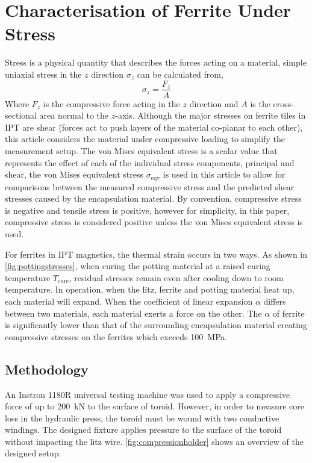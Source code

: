 \documentclass[conference]{IEEEtran}
\begin{document}
\section{Characterisation of Ferrite Under Stress}
Stress is a physical quantity that describes the forces acting on a material, simple uniaxial stress in the $z$ direction $\sigma_z$ can be calculated from, 
\begin{equation}
  \sigma_z = \frac{F_z}{A}
  \label{eqn:uniaxialstress}
\end{equation}
Where $F_z$ is the compressive force acting in the $z$ direction and $A$ is the cross-sectional area normal to the $z$-axis. 
Although the major stresses on ferrite tiles in IPT are shear (forces act to push layers of the material co-planar to each other), this article considers the material under compressive loading to simplify the measurement setup. 
The von Mises equivalent stress is a scalar value that represents the effect of each of the individual stress components, principal and shear, the von Mises equivalent stress $\sigma_\text{eqv}$ is used in this article to allow for comparisons between the measured compressive stress and the predicted shear stresses caused by the encapsulation material. 
By convention, compressive stress is negative and tensile stress is positive, however for simplicity, in this paper, compressive stress is considered positive unless the von Mises equivalent stress is used. 

For ferrites in IPT magnetics, the thermal strain occurs in two ways.
As shown in \cref{fig:pottingstresses}, when curing the potting material at a raised curing temperature $T_\text{cure}$, residual stresses remain even after cooling down to room temperature. 
In operation, when the litz, ferrite and potting material heat up, each material will expand. 
When the coefficient of linear expansion $\alpha$ differs between two materials, each material exerts a force on the other. 
The $\alpha$ of ferrite is significantly lower than that of the surrounding encapsulation material creating compressive stresses on the ferrites which exceeds \SI{100}{\mega\pascal}. 

\subsection{Methodology}

An Instron 1180R universal testing machine was used to apply a compressive force of up to \SI{200}{\kilo\newton} to the surface of toroid. 
However, in order to measure core loss in the hydraulic press, the toroid must be wound with two conductive windings. 
The designed fixture applies pressure to the surface of the toroid without impacting the litz wire.
\cref{fig:compressionholder} shows an overview of the designed setup. 
\end{document}
